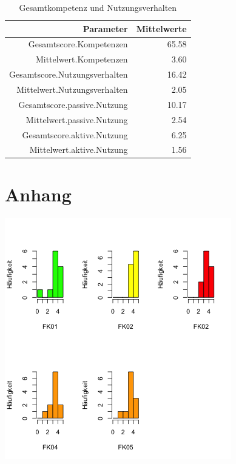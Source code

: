 \documentclass[12pt, bibliography=totoc]{scrartcl}
\begin{document}
\begin{table}[H]
\centering
\caption{Gesamtkompetenz und Nutzungsverhalten}
\begin{tabular}{rr}
  \hline
 Parameter & Mittelwerte\\
  \hline
Gesamtscore.Kompetenzen & 65.58 \\
  Mittelwert.Kompetenzen & 3.60 \\
  Gesamtscore.Nutzungsverhalten & 16.42 \\
  Mittelwert.Nutzungsverhalten & 2.05 \\
  Gesamtscore.passive.Nutzung & 10.17 \\
  Mittelwert.passive.Nutzung & 2.54 \\
  Gesamtscore.aktive.Nutzung & 6.25 \\
  Mittelwert.aktive.Nutzung & 1.56 \\
   \hline
\end{tabular}
\end{table}

\pagebreak

\pagebreak
\printbibliography
\pagebreak
\appendix


  \section{Anhang}
  \includegraphics{Anhang/schoen.png}
  


%
%
\end{document}
